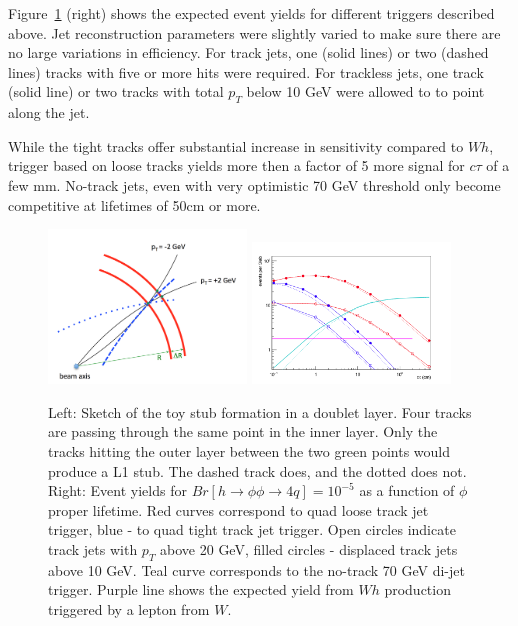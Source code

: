 Figure~\ref{fig:tracktrigger_toy} (right) shows the expected event yields for different triggers described above.
Jet reconstruction parameters were slightly varied to make sure there are no large variations in efficiency.
For track jets, one (solid lines) or two (dashed lines) tracks with five or more hits were required.
For trackless jets, one track (solid line) or two tracks with total $p_T$ below 10 GeV were allowed to to point along the jet.

While the tight tracks offer substantial increase in sensitivity compared to $Wh$, trigger based on loose tracks  
yields more then a factor of 5 more signal for $c\tau$ of a few mm. No-track jets, even with very optimistic 70 GeV threshold
only become competitive at lifetimes of 50cm or more.

\begin{figure}[hbtp]\begin{center}
\includegraphics[width=0.47\textwidth]{figures/L1TT/geom.png}
\includegraphics[width=0.47\textwidth]{figures/L1TT/final_h125.png}
\caption{ Left: Sketch of the toy stub formation in a doublet layer. Four tracks are passing through the same point in the inner layer.
Only the tracks hitting the outer layer between the two green points would produce a L1 stub. The dashed track does, and the dotted does not.
Right: Event yields for $Br[h\rightarrow\phi\phi\rightarrow 4q]=10^{-5}$ as a function of 
$\phi$ proper lifetime. Red curves correspond to
quad loose track jet trigger, blue - to quad tight track jet trigger. 
Open circles indicate track jets with $p_T$ above 20 GeV, filled circles - displaced track jets above 10 GeV. 
Teal curve corresponds to the  no-track 70 GeV di-jet trigger.
Purple line shows the expected yield from $Wh$ production triggered by a lepton from $W$.
}
\label{fig:tracktrigger_toy}
\end{center}
\end{figure}

